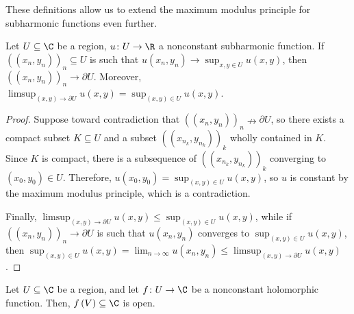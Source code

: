 \documentclass[10pt]{mypackage}
\begin{document}
These definitions allow us to extend the maximum modulus principle for subharmonic functions even further.
\begin{theorem}
  Let $U\subseteq \C$ be a region, $u\colon U\rightarrow \R$ a nonconstant subharmonic function. If $\left( \left( x_n,y_n \right) \right)_n\subseteq U$ is such that $u\left( x_n,y_n \right)\rightarrow \sup_{x,y\in U}u\left( x,y \right)$, then $\left( \left( x_n,y_n \right) \right)_n\rightarrow \partial U$. Moreover, $\limsup_{\left( x,y \right)\rightarrow \partial U}u\left( x,y \right) = \sup_{\left( x,y \right)\in U} u\left( x,y \right)$.
\end{theorem}
\begin{proof}
  Suppose toward contradiction that $\left( \left( x_n,y_n \right) \right)_n\nrightarrow \partial U$, so there exists a compact subset $K\subseteq U$ and a subset $\left( \left( x_{n_k},y_{n_k} \right) \right)_k$ wholly contained in $K$. Since $K$ is compact, there is a subsequence of $\left( \left( x_{n_k},y_{n_k} \right) \right)_k$ converging to $\left( x_0,y_0 \right)\in U$. Therefore, $u\left( x_0,y_0 \right) = \sup_{\left( x,y \right)\in U}u\left( x,y \right)$, so $u$ is constant by the maximum modulus principle, which is a contradiction.%

  Finally, $\limsup_{\left( x,y \right)\rightarrow \partial U}u\left( x,y \right)\leq \sup_{\left( x,y \right)\in U}u\left( x,y \right)$, while if $\left( \left( x_n,y_n \right) \right)_n\rightarrow \partial U$ is such that $u\left( x_n,y_n \right)$ converges to $\sup_{\left( x,y \right)\in U}u\left( x,y \right)$, then $\sup_{\left( x,y \right)\in U}u\left( x,y \right) = \lim_{n\rightarrow\infty}u\left( x_n,y_n \right) \leq \limsup_{\left( x,y \right)\rightarrow \partial U}u\left( x,y \right)$.
\end{proof}
\begin{theorem}
  Let $U\subseteq \C$ be a region, and let $f\colon U\rightarrow \C$ be a nonconstant holomorphic function. Then, $f\left( V \right)\subseteq \C$ is open.
\end{theorem}
\end{document}

